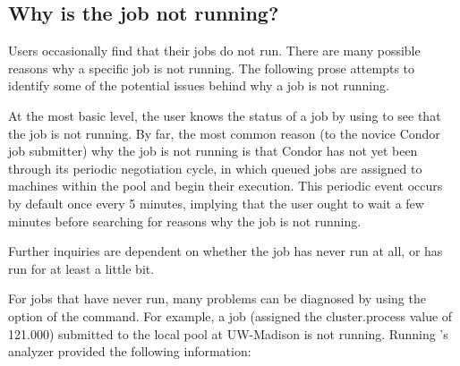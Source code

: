 \subsection{\label{sec:job-not-running}Why is the job not running?}
Users occasionally find that their jobs do not run.
There are many possible reasons why a specific job is not running.
The following prose attempts to identify some of the potential issues
behind why a job is not running.

At the most basic level, the user knows the status of a job by
using  to see that the job is not running.
By far, the most common reason (to the novice Condor job submitter)
why the job is not running is that Condor has not yet 
been through its periodic negotiation cycle,
in which queued jobs are assigned to machines within the pool 
and begin their execution.
This periodic event occurs by default once every 5 minutes,
implying that the user ought to wait a few minutes before
searching for reasons why the job is not running.

Further inquiries are dependent on whether the job has 
never run at all, or has run for at least a little bit.

For jobs that have never run,
many problems can be diagnosed by using the 
option of the  command.
For example, a job (assigned the cluster.process value of
121.000) submitted to the local pool at UW-Madison
is not running.
Running 's analyzer provided the following information:

